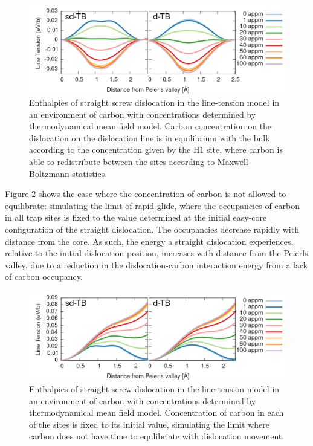 \documentclass[a4paper,11pt]{article}
\begin{document}
\begin{figure}[htbp]
\centering
\includegraphics[width=.9\linewidth]{Images/straight_line_enthalpies_equib_both.png}
\caption{Enthalpies of straight screw dislocation in the line-tension model in an environment of carbon with concentrations determined by thermodynamical mean field model. Carbon concentration on the dislocation on the dislocation line is in equilibrium with the bulk according to the concentration given by the H1 site, where carbon is able to redistribute between the sites according to Maxwell-Boltzmann statistics. \label{fig:straighttbequib}}
\end{figure}



Figure \ref{fig:straighttbstatic} shows the case where the concentration of
carbon is not allowed to equilibrate: simulating the limit of rapid glide,
where the occupancies of carbon in all trap sites is fixed to the value
determined at the initial easy-core configuration of the straight
dislocation. The occupancies decrease rapidly with distance from the
core. As such, the energy a straight dislocation experiences, relative to the initial
dislocation position, increases with
distance from the Peierls valley, due to a reduction in the
dislocation-carbon interaction energy from a lack of carbon occupancy.


\begin{figure}[htbp]
\centering
\includegraphics[width=.9\linewidth]{Images/straight_line_enthalpies_static_both.png}
\caption{Enthalpies of straight screw dislocation in the line-tension model in an environment of carbon with concentrations determined by thermodynamical mean field model. Concentration of carbon in each of the sites is fixed to its initial value, simulating the limit where carbon does not have time to equlibriate with dislocation movement. \label{fig:straighttbstatic}}
\end{figure}
\end{document}
